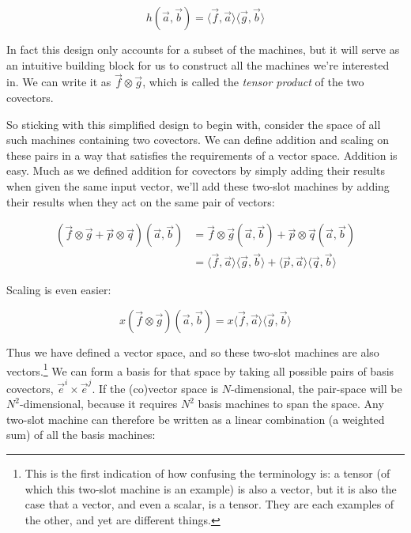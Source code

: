 $$
h(\vec{a}, \vec{b}) = \langle \vec{f},\vec{a} \rangle \langle \vec{g},\vec{b} \rangle
$$

In fact this design only accounts for a subset of the machines, but it will serve as an intuitive building block for us to construct all the machines we're interested in. We can write it as $\vec{f} \otimes \vec{g}$, which is called the \textit{tensor product} of the two covectors.

So sticking with this simplified design to begin with, consider the space of all such machines containing two covectors. We can define addition and scaling on these pairs in a way that satisfies the requirements of a vector space. Addition is easy. Much as we defined addition for covectors by simply adding their results when given the same input vector, we'll add these two-slot machines by adding their results when they act on the same pair of vectors:

\begin{equation}
\begin{split}
    (\vec{f} \otimes \vec{g} + \vec{p} \otimes \vec{q})(\vec{a}, \vec{b}) 
    &= 
    \vec{f} \otimes \vec{g} (\vec{a}, \vec{b}) + \vec{p} \otimes \vec{q}(\vec{a}, \vec{b}) \\
    &= \langle \vec{f}, \vec{a} \rangle
        \langle \vec{g}, \vec{b} \rangle
    + \langle \vec{p}, \vec{a} \rangle
        \langle \vec{q}, \vec{b} \rangle    
\end{split}        
\end{equation}

Scaling is even easier:

$$
x(\vec{f} \otimes \vec{g})(\vec{a}, \vec{b}) 
= x \langle \vec{f}, \vec{a} \rangle
    \langle \vec{g}, \vec{b} \rangle
$$
 
Thus we have defined a vector space, and so these two-slot machines are also vectors.\footnote{This is the first indication of how confusing the terminology is: a tensor (of which this two-slot machine is an example) is also a vector, but it is also the case that a vector, and even a scalar, is a tensor. They are each examples of the other, and yet are different things.} We can form a basis for that space by taking all possible pairs of basis covectors, $\vec{e}^i \times \vec{e}^j$. If the (co)vector space is $N$-dimensional, the pair-space will be $N^2$-dimensional, because it requires $N^2$ basis machines to span the space. Any two-slot machine can therefore be written as a linear combination (a weighted sum) of all the basis machines:

